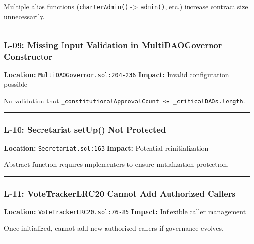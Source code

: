 \documentclass[
]{article}
\begin{document}
Multiple alias functions (\texttt{charterAdmin()} -\textgreater{}
\texttt{admin()}, etc.) increase contract size unnecessarily.

\begin{center}\rule{0.5\linewidth}{0.5pt}\end{center}

\subsubsection{L-09: Missing Input Validation in MultiDAOGovernor
Constructor}\label{l-09-missing-input-validation-in-multidaogovernor-constructor}

\textbf{Location:} \texttt{MultiDAOGovernor.sol:204-236}
\textbf{Impact:} Invalid configuration possible

No validation that
\texttt{\_constitutionalApprovalCount\ \textless{}=\ \_criticalDAOs.length}.

\begin{center}\rule{0.5\linewidth}{0.5pt}\end{center}

\subsubsection{L-10: Secretariat setUp() Not
Protected}\label{l-10-secretariat-setup-not-protected}

\textbf{Location:} \texttt{Secretariat.sol:163} \textbf{Impact:}
Potential reinitialization

Abstract function requires implementers to ensure initialization
protection.

\begin{center}\rule{0.5\linewidth}{0.5pt}\end{center}

\subsubsection{L-11: VoteTrackerLRC20 Cannot Add Authorized
Callers}\label{l-11-votetrackerlrc20-cannot-add-authorized-callers}

\textbf{Location:} \texttt{VoteTrackerLRC20.sol:76-85} \textbf{Impact:}
Inflexible caller management

Once initialized, cannot add new authorized callers if governance
evolves.

\begin{center}\rule{0.5\linewidth}{0.5pt}\end{center}
\end{document}
